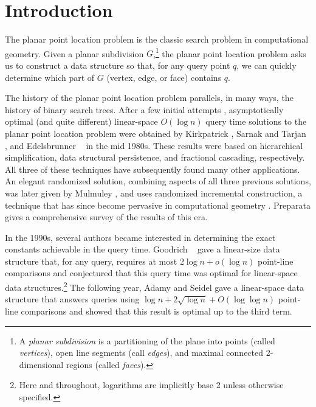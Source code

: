 \documentclass[acmtalg]{acmsmall}
\begin{document}
\maketitle

\section{Introduction}

The planar point location problem is the classic search problem in
computational geometry. Given a planar subdivision $G$,\footnote{A
\emph{planar subdivision} is a partitioning of the plane into points
(called \emph{vertices}), open line segments (call \emph{edges}), and
maximal connected 2-dimensional regions (called \emph{faces}).} the
planar point location problem asks us to construct a data structure so
that, for any query point $q$, we can quickly determine which part of
$G$ (vertex, edge, or face) contains $q$.

The history of the planar point location problem parallels, in many
ways, the history of binary search trees.  After a few initial attempts
\cite{dl76,lp77,p81}, asymptotically optimal (and quite different)
linear-space $O(\log n)$ query time solutions to the planar point
location problem were obtained by Kirkpatrick \cite{k83}, Sarnak and
Tarjan \cite{st86}, and Edelsbrunner \etal\ \cite{egs86} in the mid
1980s.  These results were based on hierarchical simplification, data
structural persistence, and fractional cascading, respectively.  All
three of these techniques have subsequently found many other
applications.  An elegant randomized solution, combining aspects of
all three previous solutions, was later given by Mulmuley \cite{m90},
and uses randomized incremental construction, a technique that has
since become pervasive in computational geometry
\cite[Section~9.5]{bcko08}.  Preparata \cite{p90} gives a
comprehensive survey of the results of this era.

In the 1990s, several authors became interested in determining the
exact constants achievable in the query time.  Goodrich \etal\
\cite{gor97} gave a linear-size data structure that, for any query,
requires at most $2\log n + o(\log n)$ point-line comparisons and
conjectured that this query time was optimal for linear-space data
structures.\footnote{Here and throughout, logarithms are implicitly base 2
unless otherwise specified.} The following year, Adamy and Seidel
\cite{as98} gave a linear-space data structure that answers queries
using $\log n + 2\sqrt{\log n} + O(\log\log n)$ point-line comparisons
and showed that this result is optimal up to the third term.
\end{document}
